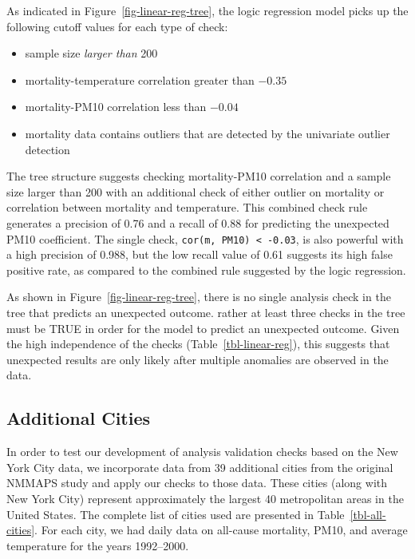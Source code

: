 \documentclass[
  12pt,
]{interact}
\providecommand{\tightlist}{%
  \setlength{\itemsep}{0pt}\setlength{\parskip}{0pt}}\usepackage{longtable,booktabs,array}
\begin{document}
As indicated in Figure~\ref{fig-linear-reg-tree}, the logic regression
model picks up the following cutoff values for each type of check:

\begin{itemize}
\tightlist
\item
  sample size \emph{larger than} 200
\item
  mortality-temperature correlation greater than \(-0.35\)
\item
  mortality-PM10 correlation less than \(-0.04\)
\item
  mortality data contains outliers that are detected by the univariate
  outlier detection
\end{itemize}

The tree structure suggests checking mortality-PM10 correlation and a
sample size larger than 200 with an additional check of either outlier
on mortality or correlation between mortality and temperature. This
combined check rule generates a precision of 0.76 and a recall of 0.88
for predicting the unexpected PM10 coefficient. The single check,
\texttt{cor(m,\ PM10)\ \textless{}\ -0.03}, is also powerful with a high
precision of 0.988, but the low recall value of 0.61 suggests its high
false positive rate, as compared to the combined rule suggested by the
logic regression.

As shown in Figure~\ref{fig-linear-reg-tree}, there is no single
analysis check in the tree that predicts an unexpected outcome. rather
at least three checks in the tree must be TRUE in order for the model to
predict an unexpected outcome. Given the high independence of the checks
(Table~\ref{tbl-linear-reg}), this suggests that unexpected results are
only likely after multiple anomalies are observed in the data.

\subsection{Additional Cities}\label{additional-cities}

In order to test our development of analysis validation checks based on
the New York City data, we incorporate data from 39 additional cities
from the original NMMAPS study and apply our checks to those data. These
cities (along with New York City) represent approximately the largest 40
metropolitan areas in the United States. The complete list of cities
used are presented in Table~\ref{tbl-all-cities}. For each city, we had
daily data on all-cause mortality, PM10, and average temperature for the
years 1992--2000.
\end{document}
